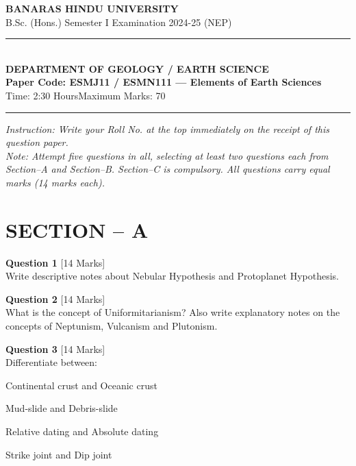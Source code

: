 \documentclass[11pt,a4paper]{article}
\begin{document}
\begin{center}
  {\large\bfseries BANARAS HINDU UNIVERSITY}\\[2pt]
  {\normalsize B.Sc. (Hons.) Semester I Examination 2024-25 (NEP)}\\[6pt]
  \rule{0.8\linewidth}{0.5pt}\\[6pt]
  {\large\bfseries DEPARTMENT OF GEOLOGY / EARTH SCIENCE}\\[4pt]
  {\large\bfseries Paper Code: ESMJ11 / ESMN111 --- Elements of Earth Sciences}\\[4pt]
  {\normalsize Time: 2:30 Hours\hfill Maximum Marks: 70}
\end{center}

\rule{\linewidth}{0.4pt}\smallskip



\noindent   \textit{Instruction: Write your Roll No. at the top immediately on the receipt of this question paper.}\\[2pt]



\noindent   \textit{Note: Attempt five questions in all, selecting at least two questions each from Section--A and Section--B. Section--C is compulsory. All questions carry equal marks (14 marks each).}
\bigskip

\section*{SECTION -- A}




\noindent   \textbf{Question 1} \hfill [14 Marks]\\
Write descriptive notes about Nebular Hypothesis and Protoplanet Hypothesis.

\bigskip




\noindent   \textbf{Question 2} \hfill [14 Marks]\\
What is the concept of Uniformitarianism? Also write explanatory notes on the concepts of Neptunism, Vulcanism and Plutonism.

\bigskip




\noindent   \textbf{Question 3} \hfill [14 Marks]\\
Differentiate between:

\begin{parts}
  \item Continental crust and Oceanic crust
  \item Mud-slide and Debris-slide
  \item Relative dating and Absolute dating
  \item Strike joint and Dip joint
\end{parts}
\end{document}
